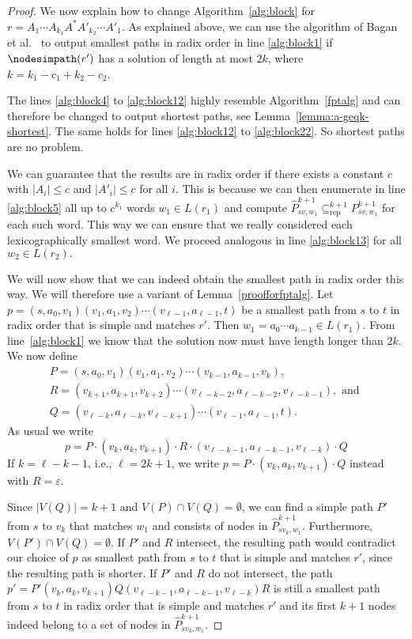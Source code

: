 \documentclass[a4paper,english]{lipics-v2016}
\theoremstyle{plain}
\begin{document}
\begin{proof}
 We now explain how to change Algorithm~\ref{alg:block} for $r = A_1 \cdots A_{k_1} A^* A'_{k_2}\cdots A'_1$.
 As explained above, we can use the algorithm of Bagan et al.~\cite[Theorem 6]{bagan} to output smallest paths in radix order in line \ref{alg:block1} if $\nodesimpath(r')$ has a solution of length at most $2k$, where $k= k_1 -c_1 + k_2 -c_2$.
 
 The lines \ref{alg:block4} to \ref{alg:block12} highly resemble Algorithm~\ref{fptalg} and can therefore be changed to output shortest paths, see Lemma~\ref{lemma:a-geqk-shortest}. The same holds for lines \ref{alg:block12} to \ref{alg:block22}. So shortest paths are no problem.

 We can guarantee that the results are in radix order if there exists a constant $c$ with $|A_i|\leq c$ and $|A'_i|\leq c$ for all $i$. 
 This is because we can then enumerate in line \ref{alg:block5} all up to $c^{k_1}$ words $w_1 \in L(r_1)$ and compute $\hat{P}^{k+1}_{sv,w_1} \subseteq^{k+1}_\text{rep} P^{k+1}_{sv,w_1}$ for each such word. This way we can ensure that we really considered each lexicographically smallest word. We proceed analogous in line \ref{alg:block13} for all $w_2 \in L(r_2).$ 
 
 We will now show that we can indeed obtain the smallest path in radix order this way. We will therefore use a variant of Lemma~\ref{proofforfptalg}. 
 Let $p=(s,a_0,v_1)(v_1,a_1,v_2) \cdots (v_{\ell-1},a_{\ell-1},t)$ be a smallest path from $s$ to $t$ in radix order that is simple and matches $r'$. Then $w_1 = a_0 \cdots a_{k-1} \in L(r_1)$. 
 From line~\ref{alg:block1} we know that the solution now must have length longer than $2k$. We now define  
 \begin{multline*}
 P=(s,a_0,v_1)(v_1,a_1,v_2) \cdots  (v_{k-1},a_{k-1},v_k), \\
 R =  (v_{k+1},a_{k+1},v_{k+2}) \cdots  (v_{\ell-k-2},a_{\ell-k-2},v_{\ell-k-1}), \text{ and } \\ Q=(v_{\ell-k},a_{\ell-k},v_{\ell-k+1}) \cdots (v_{\ell-1},a_{\ell-1},t). 
 \end{multline*}
As usual we write $$p = P\cdot (v_k,a_k,v_{k+1}) \cdot R \cdot(v_{\ell-k-1},a_{\ell-k-1},v_{\ell-k})\cdot Q$$ 
If $k = \ell -k -1$, i.e., $\ell = 2k+1$, we write $p = P\cdot (v_k,a_k,v_{k+1}) \cdot Q$ instead with $R = \varepsilon$.

 Since $|V(Q)| =k+1$ and $V(P) \cap V(Q) = \emptyset$, we can find a simple path $P'$ from $s$ to $v_k$ that matches $w_1$ and consists of nodes in 
 $\hat{P}^{k+1}_{sv_k,w_1}$. Furthermore, $V(P') \cap V(Q) = \emptyset$. If $P'$ and $R$ intersect, the resulting path would contradict our choice of $p$ as smallest path from $s$ to $t$ that is simple and matches $r'$, since the resulting path is shorter. If $P'$ and $R$ do not intersect, the path $p' = P' (v_{k},a_{k},v_{k+1}) Q (v_{\ell-k-1},a_{\ell-k-1},v_{\ell-k}) R$ is still a smallest path from $s$ to $t$ in radix order that is simple and matches $r'$ and its first $k+1$ nodes indeed belong to a set of nodes in $\hat{P}^{k+1}_{sv_k,w_1}$.
 

\end{proof}
\end{document}
